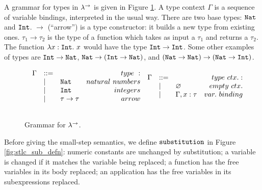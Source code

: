 A grammar for types in $\lambda^{\rightarrow}$ is given in Figure \ref{fig:stlc_type_grammar}. A type context $\Gamma$ is a sequence of variable bindings, interpreted in the usual way. There are two base types: $\mathtt{Nat}$ and $\mathtt{Int}$. $\rightarrow$ (``arrow'') is a type constructor: it builds a new type from existing ones. $\tau_1 \rightarrow \tau_2$ is the type of a function which takes as input a $\tau_1$ and returns a $\tau_2$. The function $\lambda x: \mathtt{Int}. ~x$ would have the type $\mathtt{Int} \rightarrow \mathtt{Int}$. Some other examples of types are $\mathtt{Int} \rightarrow \mathtt{Nat}$, $\mathtt{Nat} \rightarrow (\mathtt{Int} \rightarrow \mathtt{Nat})$, and $(\mathtt{Nat} \rightarrow \mathtt{Nat}) \rightarrow (\mathtt{Nat} \rightarrow \mathtt{Int})$.

\begin{figure}[h]
\vspace{-5pt}

\[
\begin{array}{lll}


\begin{array}{lllr}

\Gamma & ::= & ~ & type~: \\
	& | & \mathtt{Nat} & natural~numbers \\
	& | & \mathtt{Int} & integers \\
	& | & \tau \rightarrow \tau & arrow \\
	&&\\
	
\end{array}


\begin{array}{lllr}

\Gamma & ::= & ~ & type~ctx.: \\
	& | & \varnothing & empty~ctx. \\
	& | & \Gamma, x: \tau & var.~binding \\
	&&\\
	
\end{array}

\end{array}
\]

\vspace{-12pt}
\caption{Grammar for $\lambda^{\rightarrow}$.}
\label{fig:stlc_type_grammar}
\end{figure}

Before giving the small-step semantics, we define $\mathtt{substitution}$ in Figure \ref{fig:stlc_sub_defn}: numeric constants are unchanged by substitution; a variable is changed if it matches the variable being replaced; a function has the free variables in its body replaced; an application has the free variables in its subexpressions replaced.

